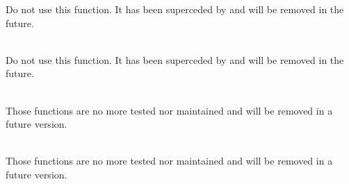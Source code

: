 \begin{DoxyRefList}
\label{deprecated__deprecated000024}%
%
Do not use this function. It has been superceded by  and will be removed in the future.  
\item[{\parbox[t]{\linewidth}{Global \doxylink{group___deprecated_real_f_f_t_ga3eb28d0ca4ac6a1350e5f01b7c30a676}{arm\+\_\+rfft\+\_\+init\+\_\+f32} (\doxylink{structarm__rfft__instance__f32}{arm\+\_\+rfft\+\_\+instance\+\_\+f32} \texorpdfstring{$\ast$}{*}S, \doxylink{structarm__cfft__radix4__instance__f32}{arm\+\_\+cfft\+\_\+radix4\+\_\+instance\+\_\+f32} \texorpdfstring{$\ast$}{*}\+S\+\_\+\+CFFT, uint32\+\_\+t fft\+Len\+Real, uint32\+\_\+t ifft\+FlagR, uint32\+\_\+t bit\+Reverse\+Flag)}}]\hfill \\
\label{deprecated__deprecated000025}%
%
Do not use this function. It has been superceded by  and will be removed in the future.  
\item[{\parbox[t]{\linewidth}{Module \doxylink{group___f_i_r___lattice}{FIR\+\_\+\+Lattice} }}]\hfill \\
\label{deprecated__deprecated000002}%
%
Those functions are no more tested nor maintained and will be removed in a future version. 
\item[{\parbox[t]{\linewidth}{Module \doxylink{group___f_i_r___sparse}{FIR\+\_\+\+Sparse} }}]\hfill \\
\label{deprecated__deprecated000003}%
%
Those functions are no more tested nor maintained and will be removed in a future version.
\end{DoxyRefList}